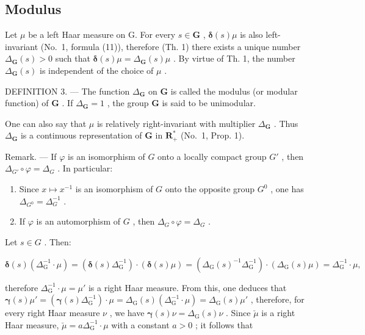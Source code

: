 \subsection{Modulus}

Let \(\mu\) be a left Haar measure on G. For every \(s \in \mathbf{G}\) , \(\pmb{\delta}(s)\mu\) is also left-invariant (No.~1, formula (11)), therefore (Th. 1) there exists a unique number \(\Delta_{\mathbf{G}}(s) > 0\) such that \(\pmb{\delta}(s)\mu = \Delta_{\mathbf{G}}(s)\mu\) . By virtue of Th. 1, the number \(\Delta_{\mathbf{G}}(s)\) is independent of the choice of \(\mu\) .

DEFINITION 3. --- The function \(\Delta_{\mathbf{G}}\) on \(\mathbf{G}\) is called the modulus (or modular function) of \(\mathbf{G}\) . If \(\Delta_{\mathbf{G}} = 1\) , the group \(\mathbf{G}\) is said to be unimodular.

One can also say that \(\mu\) is relatively right-invariant with multiplier \(\Delta_{\mathbf{G}}\) . Thus \(\Delta_{\mathbf{G}}\) is a continuous representation of \(\mathbf{G}\) in \(\mathbf{R}_{+}^{*}\) (No.~1, Prop. 1).

Remark. --- If \(\varphi\) is an isomorphism of \(G\) onto a locally compact group \(G'\) , then \(\Delta_{G'} \circ \varphi = \Delta_G\) . In particular:

\begin{enumerate}
\def\labelenumi{\arabic{enumi})}
\item
  Since \(x \mapsto x^{-1}\) is an isomorphism of \(G\) onto the opposite group \(G^0\) , one has \(\Delta_{G^0} = \Delta_{G}^{-1}\) .
\item
  If \(\varphi\) is an automorphism of \(G\) , then \(\Delta_G \circ \varphi = \Delta_G\) .
\end{enumerate}

Let \(s \in G\) . Then:

\[
\boldsymbol {\delta} (s) \left(\Delta_ {\mathrm{G}} ^ {- 1} \cdot \mu\right) = \left(\boldsymbol {\delta} (s) \Delta_ {\mathrm{G}} ^ {- 1}\right) \cdot \left(\boldsymbol {\delta} (s) \mu\right) = \left(\Delta_ {\mathrm{G}} (s) ^ {- 1} \Delta_ {\mathrm{G}} ^ {- 1}\right) \cdot \left(\Delta_ {\mathrm{G}} (s) \mu\right) = \Delta_ {\mathrm{G}} ^ {- 1} \cdot \mu ,
\]

therefore \(\Delta_{\mathrm{G}}^{-1} \cdot \mu = \mu'\) is a right Haar measure. From this, one deduces that \(\boldsymbol{\gamma}(s)\mu' = (\boldsymbol{\gamma}(s)\Delta_{\mathrm{G}}^{-1}) \cdot \mu = \Delta_{\mathrm{G}}(s)(\Delta_{\mathrm{G}}^{-1} \cdot \mu) = \Delta_{\mathrm{G}}(s)\mu'\) , therefore, for every right Haar measure \(\nu\) , we have \(\boldsymbol{\gamma}(s)\nu = \Delta_{\mathrm{G}}(s)\nu\) . Since \(\breve{\mu}\) is a right Haar measure, \(\breve{\mu} = a\Delta_{\mathrm{G}}^{-1} \cdot \mu\) with a constant \(a > 0\) ; it follows that

